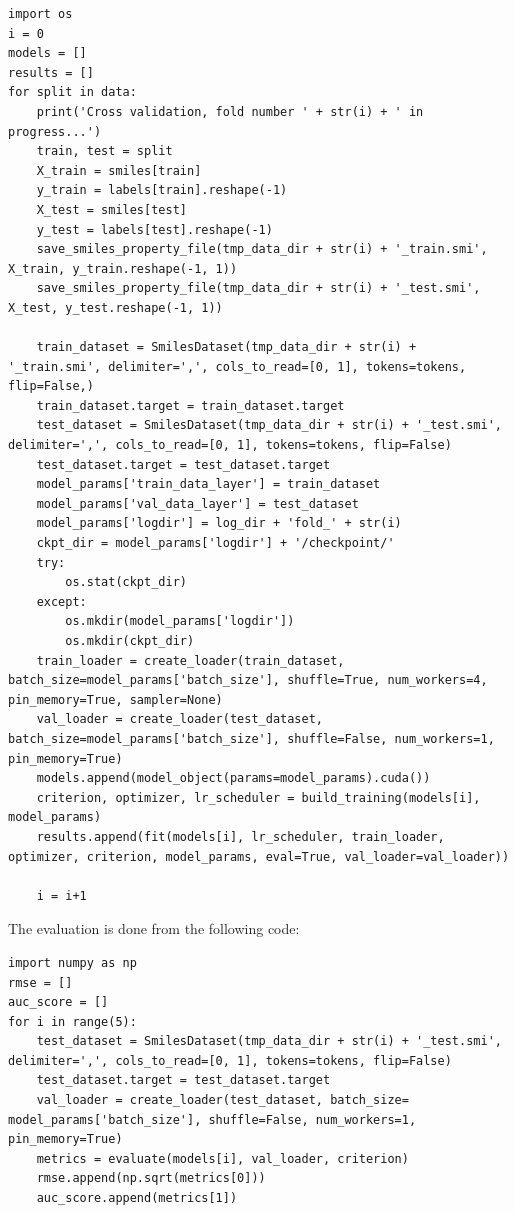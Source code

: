 \documentclass[a4paper]{article}
\begin{document}
\begin{lstlisting}
import os
i = 0
models = []
results = []
for split in data:
    print('Cross validation, fold number ' + str(i) + ' in progress...')
    train, test = split
    X_train = smiles[train]
    y_train = labels[train].reshape(-1)
    X_test = smiles[test]
    y_test = labels[test].reshape(-1)
    save_smiles_property_file(tmp_data_dir + str(i) + '_train.smi', X_train, y_train.reshape(-1, 1))
    save_smiles_property_file(tmp_data_dir + str(i) + '_test.smi', X_test, y_test.reshape(-1, 1))

    train_dataset = SmilesDataset(tmp_data_dir + str(i) + '_train.smi', delimiter=',', cols_to_read=[0, 1], tokens=tokens, flip=False,)
    train_dataset.target = train_dataset.target
    test_dataset = SmilesDataset(tmp_data_dir + str(i) + '_test.smi', delimiter=',', cols_to_read=[0, 1], tokens=tokens, flip=False)
    test_dataset.target = test_dataset.target
    model_params['train_data_layer'] = train_dataset
    model_params['val_data_layer'] = test_dataset
    model_params['logdir'] = log_dir + 'fold_' + str(i)  
    ckpt_dir = model_params['logdir'] + '/checkpoint/'
    try:
        os.stat(ckpt_dir)
    except:
        os.mkdir(model_params['logdir'])
        os.mkdir(ckpt_dir)
    train_loader = create_loader(train_dataset,  batch_size=model_params['batch_size'], shuffle=True, num_workers=4, pin_memory=True, sampler=None)
    val_loader = create_loader(test_dataset, batch_size=model_params['batch_size'], shuffle=False, num_workers=1, pin_memory=True)
    models.append(model_object(params=model_params).cuda())
    criterion, optimizer, lr_scheduler = build_training(models[i], model_params)
    results.append(fit(models[i], lr_scheduler, train_loader, optimizer, criterion, model_params, eval=True, val_loader=val_loader))
    
    i = i+1
\end{lstlisting}

The evaluation is done from the following code:

\begin{lstlisting}
import numpy as np
rmse = []
auc_score = []
for i in range(5):
    test_dataset = SmilesDataset(tmp_data_dir + str(i) + '_test.smi', delimiter=',', cols_to_read=[0, 1], tokens=tokens, flip=False)
    test_dataset.target = test_dataset.target
    val_loader = create_loader(test_dataset, batch_size= model_params['batch_size'], shuffle=False, num_workers=1, pin_memory=True)
    metrics = evaluate(models[i], val_loader, criterion)
    rmse.append(np.sqrt(metrics[0]))
    auc_score.append(metrics[1])
\end{lstlisting}
\end{document}
